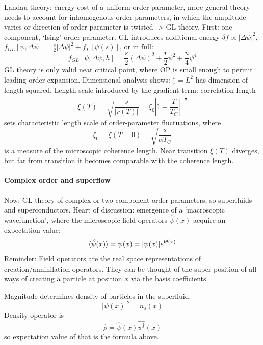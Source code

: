 \documentclass[../notes.tex]{subfiles}
\begin{document}
Landau theory: energy cost of a uniform order parameter, more general theory needs to account for inhomogenous order parameters, in which the amplitude varies or direction of order parameter is twisted -> GL theory.
First: one-component, `Ising' order parameter.
GL introduces additional energy \(\delta f \propto \vert \Delta \psi \vert^2\), \(f_{GL} [\psi, \Delta \psi] = \frac{s}{2} \vert \Delta \psi \vert^2 + f_L [\psi(s)]\), or in full:
\begin{equation}
	f_{GL} [\psi, \Delta \psi, h] = \frac{s}{2} (\Delta \psi)^2 + \frac{r}{2} \psi^2 + \frac{u}{4} \psi^4
\end{equation}
GL theory is only valid near critical point, where OP is small enough to permit leading-order expansion.
Dimensional analysis shows: \(\frac{s}{r} = L^2\) has dimension of length squared.
Length scale introduced by the gradient term: correlation length
\begin{equation}
	\xi (T) = \sqrt{\frac{s}{\vert r(T) \vert}} = \xi_0 \left\vert 1 - \frac{T}{T_C} \right\vert^{-\frac{1}{2}}
\end{equation}
sets characteristic length scale of order-parameter fluctuations, where
\begin{equation}
	\xi_0 = \xi (T = 0) = \sqrt{\frac{s}{\alpha T_C}}
\end{equation}
is a measure of the microscopic coherence length.
Near transition \(\xi (T)\) diverges, but far from transition it becomes comparable with the coherence length.

\paragraph{Complex order and superflow} 

Now: GL theory of complex or two-component order parameters, so superfluids and superconductors.
Heart of discussion: emergence of a `macroscopic wavefunction', where the microscopic field operators \(\hat{\psi}(x)\) acquire an expectation value:
\begin{equation}
	\braket{\hat{\psi} (x)} = \psi (x) = \vert \psi (x) \vert e^{\mathrm{i} \theta(x)}
\end{equation}
Reminder: Field operators are the real space representations of creation/annihilation operators.
They can be thought of the super position of all ways of creating a particle at position \(x\) via the basis coefficients.

Magnitude determines density of particles in the superfluid:
\begin{equation}
	\vert \psi(x) \vert^2 = n_s (x)
\end{equation}
Density operator is
\begin{equation}
	\hat{\rho} = \hat{\psi} (x) \hat{\psi^{\dagger}} (x)
\end{equation}
so expectation value of that is the formula above.
\end{document}
